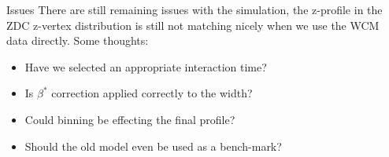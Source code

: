 \begin{frame}{Issues}
There are still remaining issues with the simulation, the z-profile in the ZDC
z-vertex distribution is still not matching nicely when we use the WCM data
directly. Some thoughts:
	\begin{itemize}
    \item Have we selected an appropriate interaction time?
    \item Is $\beta^{*}$ correction applied correctly to the width?
    \item Could binning be effecting the final profile?
    \item Should the old model even be used as a bench-mark?
	\end{itemize}
\end{frame}
